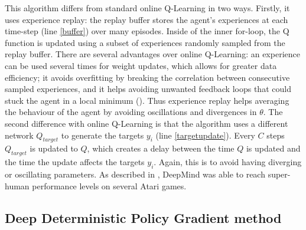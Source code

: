 This algorithm differs from standard online Q-Learning in two ways. Firstly, it uses experience replay: the replay buffer stores the agent's experiences at each time-step (line \ref{buffer}) over many episodes. Inside of the inner for-loop, the Q function is updated using a subset of experiences randomly sampled from the replay buffer. There are several advantages over online Q-Learning: an experience can be used several times for weight updates, which allows for greater data efficiency; it avoids overfitting by breaking the correlation between consecutive sampled experiences, and it helps avoiding unwanted feedback loops that could stuck the agent in a local minimum (\cite{temporaldiff}). Thus experience replay helps averaging the behaviour of the agent by avoiding oscillations and divergences in $\theta$. \newline
The second difference with online Q-Learning is that the algorithm uses a different network $Q_{target}$ to generate the targets $y_i$ (line \ref{targetupdate}). Every $C$ steps $Q_{target}$ is updated to $Q$, which creates a delay between the time $Q$ is updated and the time the update affects the targets $y_i$. Again, this is to avoid having diverging or oscillating parameters. As described in \cite{drl}, DeepMind was able to reach super-human performance levels on several Atari games.

\subsection{Deep Deterministic Policy Gradient method}
\label{ddpgsection}
		
